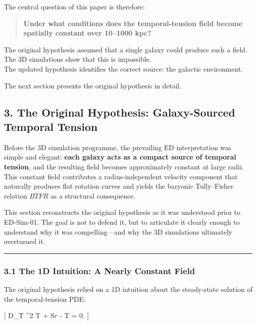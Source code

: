The central question of this paper is therefore:

\begin{quote}
\textbf{Under what conditions does the temporal-tension field become
spatially constant over 10--1000 kpc?}
\end{quote}

The original hypothesis assumed that a single galaxy could produce such
a field.\\
The 3D simulations show that this is impossible.\\
The updated hypothesis identifies the correct source: the galactic
environment.

The next section presents the original hypothesis in detail.

\subsection{3. The Original Hypothesis: Galaxy-Sourced Temporal
Tension}\label{the-original-hypothesis-galaxy-sourced-temporal-tension}

Before the 3D simulation programme, the prevailing ED interpretation was
simple and elegant: \textbf{each galaxy acts as a compact source of
temporal tension}, and the resulting field becomes approximately
constant at large radii. This constant field contributes a
radius-independent velocity component that naturally produces flat
rotation curves and yields the baryonic Tully--Fisher relation \(BTFR\)
as a structural consequence.

This section reconstructs the original hypothesis as it was understood
prior to ED-Sim-01. The goal is not to defend it, but to articulate it
clearly enough to understand why it was compelling---and why the 3D
simulations ultimately overturned it.

\begin{center}\rule{0.5\linewidth}{0.5pt}\end{center}

\subsubsection{3.1 The 1D Intuition: A Nearly Constant
Field}\label{the-1d-intuition-a-nearly-constant-field}

The original hypothesis relied on a 1D intuition about the steady-state
solution of the temporal-tension PDE:

{[} D\_T \nabla\^{}2 T + S\(r\) - \chi T = 0.  {]}


